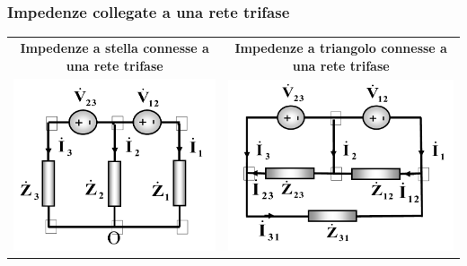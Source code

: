 \documentclass{article}
\begin{document}
\subsubsection{Impedenze collegate a una rete trifase}
\begin{center}
    \begin{tabular}{c c}
        \textbf{Impedenze a stella connesse a una rete trifase} & \textbf{Impedenze a triangolo connesse a una rete trifase}
        \\
        \includegraphics[scale=0.26]{Image/Impedenze_connesse_1.png}
        &
        \includegraphics[scale=0.26]{Image/Impedenze_connesse_2.png}
    \end{tabular}
\end{center}
\end{document}
